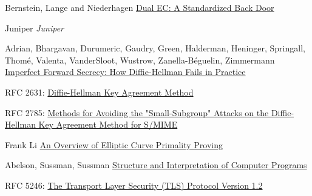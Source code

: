 \documentclass[a4paper,11pt]{article}
\begin{document}
\begin{thebibliography}{1}

 Bernstein, Lange and Niederhagen \href{https://eprint.iacr.org/2015/767.pdf}{Dual EC: A Standardized Back Door}

 Juniper {\em Juniper}

 Adrian, Bhargavan, Durumeric, Gaudry, Green, Halderman, Heninger, Springall, Thomé, Valenta,  VanderSloot, Wustrow, Zanella-Béguelin, Zimmermann \href{https://weakdh.org/imperfect-forward-secrecy-ccs15.pdf}{Imperfect Forward Secrecy: How Diffie-Hellman Fails in Practice}

 RFC 2631: \href{https://tools.ietf.org/html/rfc2631}{Diffie-Hellman Key Agreement Method}

 RFC 2785: \href{https://tools.ietf.org/html/rfc2785}{Methods for Avoiding the "Small-Subgroup" Attacks on the Diffie-Hellman Key Agreement Method for S/MIME}

 Frank Li \href{http://theory.stanford.edu/~dfreeman/cs259c-f11/finalpapers/primalityproving.pdf}{An Overview of Elliptic Curve Primality Proving}

 Abelson, Sussman, Sussman \href{https://mitpress.mit.edu/sicp/chapter1/footnode.html#2413}{Structure and Interpretation of Computer Programs}

 RFC 5246: \href{https://www.ietf.org/rfc/rfc5246.txt}{The Transport Layer Security (TLS) Protocol Version 1.2}

\end{thebibliography}
\end{document}
